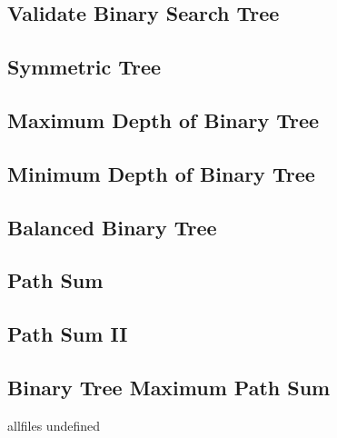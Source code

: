 \documentclass{article}
\begin{document}
\begin{CJK}{UTF8}{gbsn}     %

\else
	
\subsection{Validate Binary Search Tree}

\subsection{Symmetric Tree}

\subsection{Maximum Depth of Binary Tree}

\subsection{Minimum Depth of Binary Tree}

\subsection{Balanced Binary Tree}

\subsection{Path Sum}

\subsection{Path Sum II}

\subsection{Binary Tree Maximum Path Sum}


\fi

\ifx allfiles undefined
\end{CJK}
\end{document}
